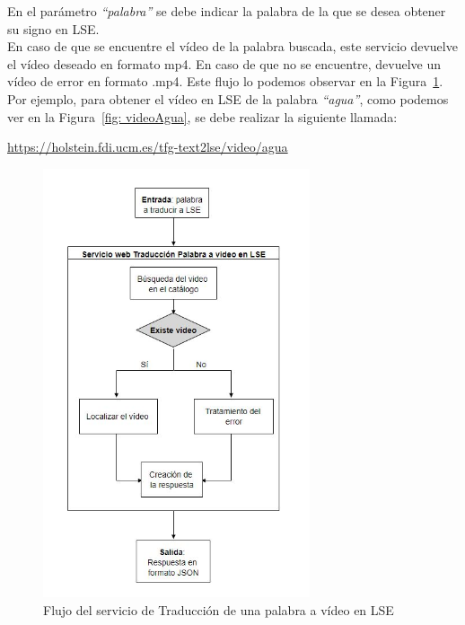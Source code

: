 En el parámetro \textit{``palabra''} se debe indicar la palabra de la que se desea obtener su signo en LSE. \\

En caso de que se encuentre el vídeo de la palabra buscada, este servicio devuelve el vídeo deseado en formato mp4. En caso de que no se encuentre, devuelve un vídeo de error en formato .mp4. Este flujo lo podemos observar en la Figura~\ref {fig: imgFlujo1palabraText2LSE}. \\

Por ejemplo, para obtener el vídeo en LSE de la palabra \textit{``agua''}, como podemos ver en la Figura~\ref {fig: videoAgua}, se debe realizar la siguiente llamada:

\begin{shaded}
	\url{https://holstein.fdi.ucm.es/tfg-text2lse/video/agua }	
\end{shaded}


\begin{figure}[]
	\centering
	\includegraphics[width=0.7\textwidth]{Imagenes/Fuentes/Text2LSE/FlujoVideo1palabra.jpg}
	\caption{Flujo del servicio de Traducción de una palabra a vídeo en LSE}
	\label {fig: imgFlujo1palabraText2LSE}
\end{figure}

